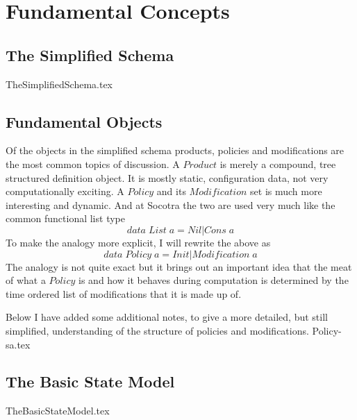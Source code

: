 %
%
%
\chapter{Fundamental Concepts}
\label{intro} %


\section{The Simplified Schema}
\label{sec:01:1}
{TheSimplifiedSchema.tex}

\section{Fundamental Objects}
Of the objects in the simplified schema products, policies and modifications are the most common topics
of discussion. A $Product$ is merely a compound, tree structured definition object. It is mostly static,
configuration data, not very computationally exciting. A $Policy$ and its $Modification$ set is much more
interesting and dynamic. And at Socotra the two are used very much like the common functional list type
\begin{equation*}
  data \; List \; a = Nil | Cons \; a
\end{equation*}
To make the analogy more explicit, I will rewrite the above as
\begin{equation*}
  data \; Policy \; a = Init | Modification  \; a
\end{equation*}
The analogy is not quite exact but it brings out an important idea that the meat of what a $Policy$ is and
how it behaves during computation is determined by the time ordered list of modifications that it is made up
of.

Below I have added some additional notes, to give a more detailed, but still simplified, understanding of
the structure of policies and modifications.
\label{sec:01:2}
{Policy-sa.tex}

\section{The Basic State Model}
\label{sec:01:3}
{TheBasicStateModel.tex}



